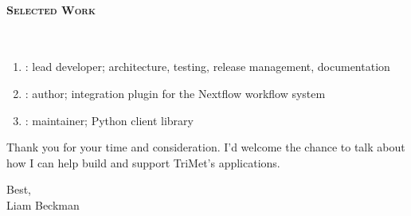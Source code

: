 \paragraph{\textsc{Selected Work}}\

\vspace*{0.3\baselineskip}

\begin{enumerate}[itemsep=0pt, topsep=1pt]

\item {}: lead developer; architecture, testing, release management, documentation

\item {}: author; integration plugin for the Nextflow workflow system

\item {}: maintainer; Python client library

\end{enumerate}

\vspace*{0.3\baselineskip}

Thank you for your time and consideration. I'd welcome the chance to talk about how I can help build and support TriMet's applications.

Best,\\

Liam Beckman

\vfill \myBreak{}



